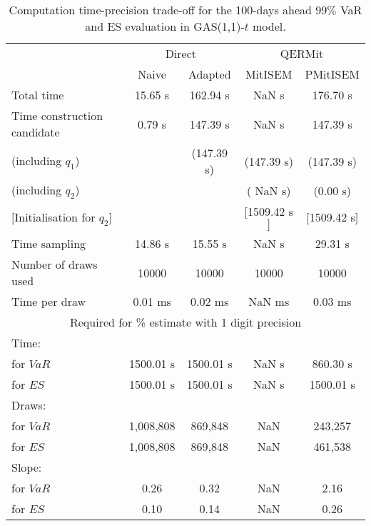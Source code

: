 { \renewcommand{\arraystretch}{1.3} 
\begin{table}[h] 
\centering 
\caption{Computation time-precision trade-off for the 100-days ahead  $99\%$ VaR and ES evaluation in GAS(1,1)-$t$ model.} 
\label{tab:time_precision_t_gas} 
\begin{tabular}{lcccc}  
  & \multicolumn{2}{c}{Direct} & \multicolumn{2}{c}{QERMit}  \\ \cline{2-5} 
  & Naive & Adapted & MitISEM & PMitISEM  \\ \hline 
Total time & 15.65 s & 162.94 s &  NaN s & 176.70 s \\ 
Time construction candidate & 0.79 s & 147.39 s &  NaN s & 147.39 s \\ 
 (including $q_{1}$) &   &  (147.39 s) & (147.39 s) & (147.39 s) \\ 
 (including $q_{2}$) &   &  & ( NaN s) & (0.00 s) \\ 
$[$Initialisation for $q_{2}$$]$&   &   & $[$1509.42 s$]$ & $[$1509.42 s$]$ \\ 
Time sampling & 14.86 s & 15.55 s &  NaN s & 29.31 s  \\  
Number of draws used & 10000 & 10000 & 10000 & 10000 \\ 
Time per draw & 0.01 ms & 0.02 ms &  NaN ms & 0.03 ms \\ \hline 
\multicolumn{5}{c}{Required for \% estimate with 1 digit precision} \\ \hline 
Time: &  &  &   &  \\ 
\hspace{1cm} for $VaR$ & 1500.01 s & 1500.01 s &  NaN s & 860.30 s \\ 
\hspace{1cm} for $ES$ & 1500.01 s & 1500.01 s &  NaN s & 1500.01 s \\ 
Draws: &  &  &   &  \\ 
\hspace{1cm} for $VaR$ & 1,008,808 & 869,848  & NaN  & 243,257  \\ 
\hspace{1cm} for $ES$ & 1,008,808 & 869,848  & NaN   & 461,538  \\ 
\hline 
Slope: &  &  &   &  \\ 
\hspace{1cm} for $VaR$ & 0.26 & 0.32  &  NaN  & 2.16  \\ 
\hspace{1cm} for $ES$ & 0.10 & 0.14  &  NaN   & 0.26  \\  \hline 
\end{tabular} 
\end{table} 
} 
